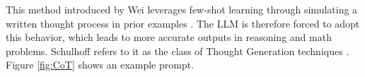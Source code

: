 This method introduced by Wei leverages few-shot learning through simulating a written thought process in prior examples \cite{Wei.28.01.2022}. The LLM is therefore forced to adopt this behavior, which leads to more accurate outputs in reasoning and math problems. Schulhoff refers to it as the class of Thought Generation techniques \cite{Schulhoff.06.06.2024}. Figure \ref{fig:CoT} shows an example prompt.
